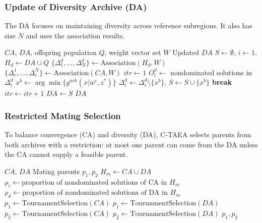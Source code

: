 \documentclass[12pt]{article}
\begin{document}
\subsubsection{Update of Diversity Archive (DA)}
The DA focuses on maintaining diversity across reference subregions. It also has size \(N\) and uses the association results.
\begin{algorithm}
\caption{Update Mechanism of the DA}
\label{alg:updateDA}
\begin{algorithmic}[1]
\Require $CA$, $DA$, offspring population $Q$, weight vector set $W$
\Ensure Updated $DA$
\State $S \gets \emptyset$, $i \gets 1$, $H_d \gets DA \cup Q$
\State $\{\Delta_1^d, \dots, \Delta_N^d\} \gets \text{Association}(H_d, W)$
\State $\{\Delta_c^1, \dots, \Delta_c^N\} \gets \text{Association}(CA, W)$
\State $itr \gets 1$
                    \State $O_i^d \gets$ nondominated solutions in $\Delta_i^d$
                    \State $x^b \gets \arg\min\{g^{ach}(x|w^c, z^*)\}$
                    \State $\Delta_i^d \gets \Delta_i^d \setminus \{x^b\}$, $S \gets S \cup \{x^b\}$
                \Else
                    \State \textbf{break}
                \EndIf
            \EndFor
        \EndIf
    \EndFor
    \State $itr \gets itr + 1$
\EndWhile
\State $DA \gets S$
\State \Return $DA$
\end{algorithmic}
\end{algorithm}

\newpage
\subsubsection{Restricted Mating Selection}
To balance convergence (CA) and diversity (DA), C-TAEA selects parents from both archives with a restriction: at most one parent can come from the DA unless the CA cannot supply a feasible parent.
\begin{algorithm}
\caption{Restricted Mating Selection}
\label{alg:mating}
\begin{algorithmic}[1]
\Require $CA$, $DA$
\Ensure Mating parents $p_1, p_2$
\State $H_m \gets CA \cup DA$
\State $\rho_c \gets \text{proportion of nondominated solutions of CA in } H_m$
\State $\rho_d \gets \text{proportion of nondominated solutions of DA in } H_m$
    \State $p_1 \gets \text{TournamentSelection}(CA)$
\Else
    \State $p_1 \gets \text{TournamentSelection}(DA)$
\EndIf
{}
    \State $p_2 \gets \text{TournamentSelection}(CA)$
\Else
    \State $p_2 \gets \text{TournamentSelection}(DA)$
\EndIf
\State \Return $p_1, p_2$
\end{algorithmic}
\end{algorithm}
\end{document}
